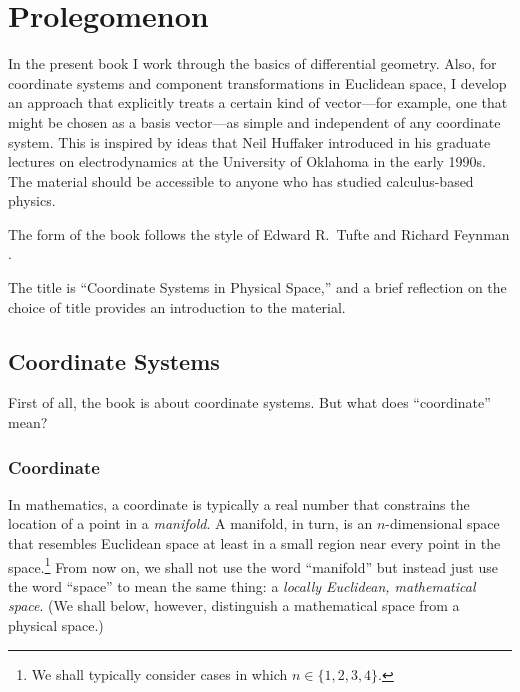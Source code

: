 \documentclass[twocolumn,10pt]{book}
\begin{document}


\pagestyle{fancy}
\lhead{%
   \sffamily
   \textbf{\doctitle}\\
   \docsubtitle}
\chead{}

\renewcommand{\headrulewidth}{1pt}
\renewcommand{\footrulewidth}{1pt}
\lfoot{}
\cfoot{\sffamily\thepage}
\rfoot{}

\mainmatter

\chapter{Prolegomenon}

In the present book I work through the basics of differential geometry.  Also,
for coordinate systems and component transformations in Euclidean space, I
develop an approach that explicitly treats a certain kind of vector---for
example, one that might be chosen as a basis vector---as simple and independent
of any coordinate system.  This is inspired by ideas that Neil Huffaker
introduced in his graduate lectures on electrodynamics at the University of
Oklahoma in the early 1990s.  The material should be accessible to anyone who
has studied calculus-based physics.

The form of the book follows the style of Edward R.~Tufte and Richard Feynman
\citep{pkg-tufte}.

The title is ``Coordinate Systems in Physical Space,'' and a brief reflection
on the choice of title provides an introduction to the material.

\section{Coordinate Systems}

First of all, the book is about coordinate systems.  But what does
``coordinate'' mean?

\subsection{Coordinate}

In mathematics, a coordinate is typically a real number that constrains the
location of a point in a \emph{manifold}.  A manifold, in turn, is an
$n$-dimensional space that resembles Euclidean space at least in a small region
near every point in the space.\footnote{%
   We shall typically consider cases in which $n \in \{1, 2, 3, 4\}$.%
}
From now on, we shall not use the word ``manifold'' but instead just use the
word ``space'' to mean the same thing: a \emph{locally Euclidean, mathematical
space}.  (We shall below, however, distinguish a mathematical space from a
physical space.)
\end{document}
